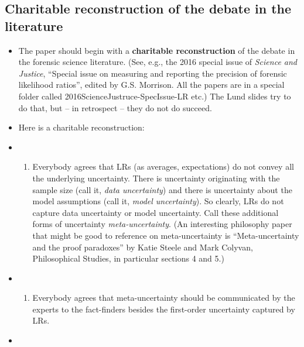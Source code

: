 \documentclass[
  10pt,
  dvipsnames,enabledeprecatedfontcommands]{scrartcl}
\providecommand{\tightlist}{%
  \setlength{\itemsep}{0pt}\setlength{\parskip}{0pt}}
\begin{document}
\hypertarget{charitable-reconstruction-of-the-debate-in-the-literature}{%
\subsection{Charitable reconstruction of the debate in the
literature}\label{charitable-reconstruction-of-the-debate-in-the-literature}}

\begin{itemize}
\item
  The paper should begin with a \textbf{charitable reconstruction} of
  the debate in the forensic science literature. (See, e.g., the 2016
  special issue of \emph{Science and Justice}, ``Special issue on
  measuring and reporting the precision of forensic likelihood ratios'',
  edited by G.S. Morrison. All the papers are in a special folder called
  2016ScienceJustruce-SpecIssue-LR etc.) The Lund slides try to do that,
  but -- in retrospect -- they do not do succeed.
\item
  Here is a charitable reconstruction:
\item
  \begin{enumerate}
  \def\labelenumi{(\roman{enumi})}
  \tightlist
  \item
    Everybody agrees that LRs (as averages, expectations) do not convey
    all the underlying uncertainty. There is uncertainty originating
    with the sample size (call it, \emph{data uncertainty}) and there is
    uncertainty about the model assumptions (call it, \emph{model
    uncertainty}). So clearly, LRs do not capture data uncertainty or
    model uncertainty. Call these additional forms of uncertainty
    \emph{meta-uncertainty}. (An interesting philosophy paper that might
    be good to reference on meta-uncertainty is ``Meta-uncertainty and
    the proof paradoxes'' by Katie Steele and Mark Colyvan,
    Philosophical Studies, in particular sections 4 and 5.)
  \end{enumerate}
\item
  \begin{enumerate}
  \def\labelenumi{(\roman{enumi})}
  \setcounter{enumi}{1}
  \tightlist
  \item
    Everybody agrees that meta-uncertainty should be communicated by the
    experts to the fact-finders besides the first-order uncertainty
    captured by LRs.
  \end{enumerate}
\item
  \begin{enumerate}
  \def\labelenumi{(\roman{enumi})}

\end{enumerate}
\end{itemize}
\end{document}
